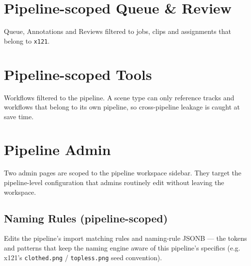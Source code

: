 \section{Pipeline-scoped Queue \& Review}
\label{sec:ws-queue-review}

Queue, Annotations and Reviews filtered to jobs, clips and assignments that
belong to \texttt{x121}.


\section{Pipeline-scoped Tools}
\label{sec:ws-tools}

Workflows filtered to the pipeline. A scene type can only reference tracks and
workflows that belong to its own pipeline, so cross-pipeline leakage is caught
at save time.


\section{Pipeline Admin}
\label{sec:ws-admin}

Two admin pages are scoped to the pipeline workspace sidebar. They target the
pipeline-level configuration that admins routinely edit without leaving the
workspace.

\subsection{Naming Rules (pipeline-scoped)}

Edits the pipeline's import matching rules and naming-rule JSONB — the tokens
and patterns that keep the naming engine aware of this pipeline's specifics
(e.g. x121's \texttt{clothed.png} / \texttt{topless.png} seed convention).



